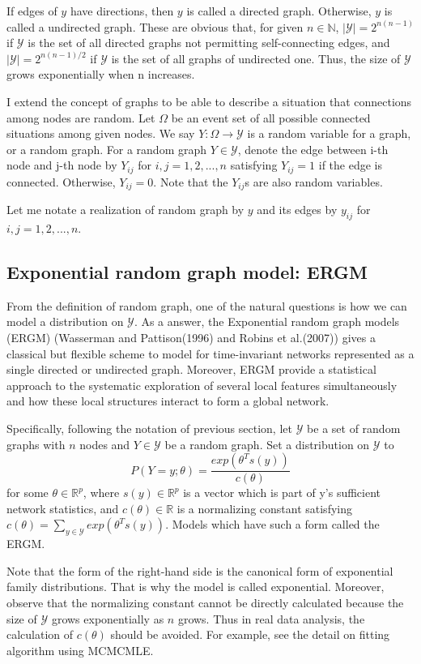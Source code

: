 \documentclass[aspectratio=169,ignorenonframetext,9pt]{beamer}
\theoremstyle{plain}
\theoremstyle{definition}
\begin{document}
If edges of $y$ have directions, then $y$ is called a directed graph. Otherwise, $y$ is called a undirected graph.
These are obvious that, for given $n\in \mathbb{N}$,
$|\mathcal{Y}|=2^{n(n-1)}$ if $\mathcal{Y}$ is the set of all directed graphs not permitting self-connecting edges,
and $|\mathcal{Y}|=2^{n(n-1)/2}$ if $\mathcal{Y}$ is the set of all graphs of undirected one.
Thus, the size of $\mathcal{Y}$ grows exponentially when n increases.

I extend the concept of graphs to be able to describe a situation that connections among nodes are random.
Let $\Omega$ be an event set of all possible connected situations among given nodes.
We say $Y: \Omega \to \mathcal{Y}$ is a random variable for a graph, or a random graph.
For a random graph $Y \in \mathcal{Y}$, denote the edge between i-th node and j-th node by $Y_{ij}$ for $i,j=1,2,...,n$
satisfying $Y_{ij}=1$ if the edge is connected. Otherwise, $Y_{ij}=0$.
Note that the $Y_{ij}$s are also random variables.

Let me notate a realization of random graph by $y$ and its edges by $y_{ij}$ for $i,j=1,2,...,n$.


\subsection{Exponential random graph model: ERGM}
From the definition of random graph, one of the natural questions is 
how we can model a distribution on $\mathcal{Y}$.
As a answer, the Exponential random graph models (ERGM) (Wasserman and Pattison(1996) and Robins et al.(2007)) %
gives a classical but 
flexible scheme to model for time-invariant networks represented as a single directed or undirected graph.
Moreover, ERGM provide a statistical approach to the systematic exploration of several local features simultaneously and 
how these local structures interact to form a global network.

Specifically, following the notation of previous section,
let $\mathcal{Y}$ be a set of random graphs with $n$ nodes and $Y \in \mathcal{Y}$ be a random graph.
Set a distribution on $\mathcal{Y}$ to
    \[P(Y=y;\theta) = \frac{exp(\theta^{T}s(y))}{c(\theta)}\]
for some $\theta\in\mathbb{R}^p$,
where $s(y)\in\mathbb{R}^p$ is a vector which is part of y's sufficient network statistics,
and $c(\theta)\in\mathbb{R}$ is a normalizing constant satisfying $c(\theta)=\sum_{y\in\mathcal{Y}}exp(\theta^{T}s(y))$.
Models which have such a form called the ERGM.

Note that the form of the right-hand side is the canonical form of exponential family distributions.
That is why the model is called exponential. Moreover, observe that the normalizing constant cannot be directly calculated
because the size of $\mathcal{Y}$ grows exponentially as $n$ grows.
Thus in real data analysis, the calculation of $c(\theta)$ should be avoided.
For example, see the detail on fitting algorithm using MCMCMLE. %
\end{document}
